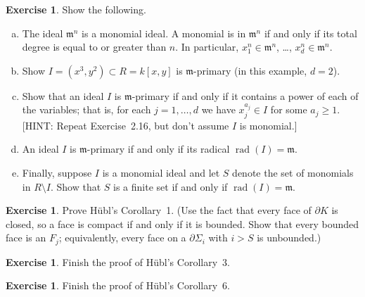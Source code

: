 \documentclass{amsart}
\theoremstyle{plain}
\theoremstyle{definition}
\newtheorem{exercise}[theorem]{Exercise}
\theoremstyle{definition}
\DeclareMathOperator{\radname}{rad}
\newcommand{\rad}[1]{\radname(#1)}
\newcommand{\m}{\mathfrak{m}}
\newcommand{\boundary}{\partial}
\begin{document}
\begin{exercise}
Show the following.
\begin{enumerate}[a.]
\item The ideal $\m^n$ is a monomial ideal.
A monomial is in $\m^n$ if and only if its total degree is equal to or greater than $n$.
In particular, $x_1^n \in \m^n$, \dots, $x_d^n \in \m^n$.
\item Show $I = (x^3,y^2) \subset R = k[x,y]$ is $\m$-primary (in this example, $d=2$).
\item Show that an ideal $I$ is $\m$-primary if and only if it contains a power of each of the variables;
that is, for each $j = 1, \dots, d$ we have $x_j^{a_j} \in I$ for some $a_j \geq 1$.
[HINT: Repeat Exercise~2.16, but don't assume $I$ is monomial.]
\item An ideal $I$ is $\m$-primary if and only if its radical $\rad{I} = \m$.
\item Finally, suppose $I$ is a monomial ideal and let $S$ denote the set of monomials in $R\setminus I$.
Show that $S$ is a finite set if and only if $\rad{I}=\m$.
\end{enumerate}
\end{exercise}


\begin{exercise}
Prove H\"ubl's Corollary~1.
(Use the fact that every face of $\boundary K$ is closed,
so a face is compact if and only if it is bounded.
Show that every bounded face is an $F_j$; equivalently,
every face on a $\boundary \Sigma_i$ with $i>S$ is unbounded.)
\end{exercise}

\begin{exercise}
Finish the proof of H\"ubl's Corollary~3.
\end{exercise}


\begin{exercise}
Finish the proof of H\"ubl's Corollary~6.
\end{exercise}
\end{document}
